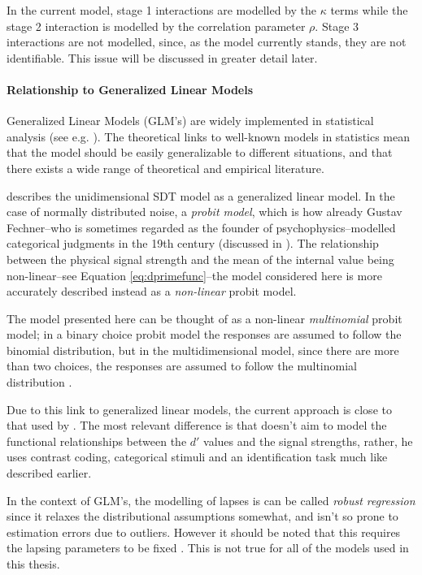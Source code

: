 \documentclass{article}\usepackage{knitr}
\begin{document}
In the current model, stage 1 interactions are modelled by the $\kappa$ terms while the stage 2 interaction is modelled by the correlation parameter $\rho$. Stage 3 interactions are not modelled, since, as the model currently stands, they are not identifiable. This issue will be discussed in greater detail later. 

\paragraph{Relationship to Generalized Linear Models}

Generalized Linear Models (GLM's) are widely implemented in statistical analysis (see e.g. \citet{kruschke2015, skrondahl2004}). The theoretical links to well-known models in statistics mean that the model should be easily generalizable to different situations, and that there exists a wide range of theoretical and empirical literature. 
 
\cite{decarlo1998} describes the unidimensional SDT model as a generalized linear model. In the case of normally distributed noise, a \textit{probit model}, which is how already Gustav Fechner--who is sometimes regarded as the founder of psychophysics--modelled categorical judgments in the 19th century (discussed in \citealt[Chapter 7]{stigler2003}). The relationship between the physical signal strength and the mean of the internal value being non-linear--see Equation \ref{eq:dprimefunc}--the model considered here is more accurately described instead as a \textit{non-linear} \citep[p. 379]{box2005} probit model. 

The model presented here can be thought of as a non-linear \textit{multinomial} probit model; in a binary choice probit model the responses are assumed to follow the binomial distribution, but in the multidimensional model, since there are more than two choices, the responses are assumed to follow the multinomial distribution \cite[p. ERROR]{skrondahl2004}. 

Due to this link to generalized linear models, the current approach is close to that used by \cite{cohen2003}. The most relevant difference is that \citeauthor{cohen2003} doesn't aim to model the functional relationships between the $d'$ values and the signal strengths, rather, he uses contrast coding, categorical stimuli and an identification task much like described earlier.

In the context of GLM's, the modelling of lapses is can be called \textit{robust regression} \citep[p. 635]{kruschke2015} since it relaxes the distributional assumptions somewhat, and isn't so prone to estimation errors due to outliers. However it should be noted that this requires the lapsing parameters to be fixed \citep[p. ERROR]{skrondahl2004}. This is not true for all of the models used in this thesis.
\end{document}
